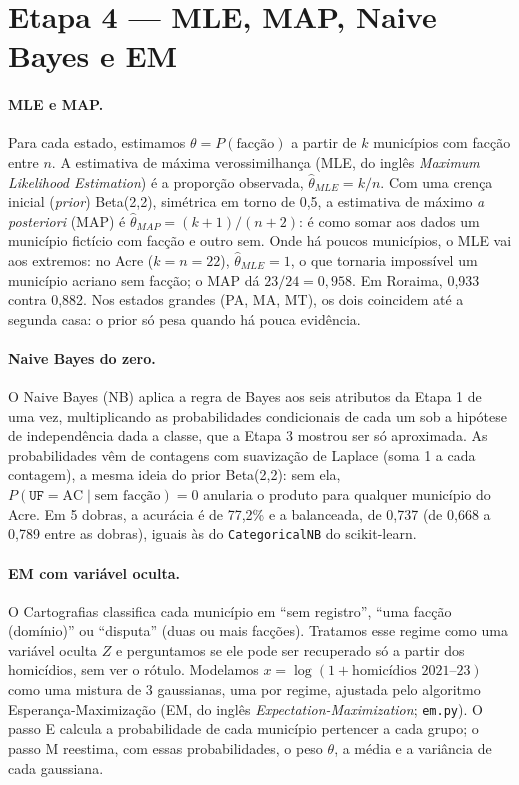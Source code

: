 \documentclass[article,12pt,oneside,a4paper,brazil,sumario=tradicional]{abntex2}
\begin{document}
\section{Etapa 4 --- MLE, MAP, Naive Bayes e EM}

\paragraph{MLE e MAP.} Para cada estado, estimamos $\theta=P(\text{facção})$ a partir de $k$
municípios com facção entre $n$. A estimativa de máxima verossimilhança (MLE, do inglês
\emph{Maximum Likelihood Estimation}) é a proporção observada, $\hat\theta_{MLE}=k/n$. Com
uma crença inicial (\emph{prior}) Beta(2,2), simétrica em torno de 0,5, a estimativa de
máximo \emph{a posteriori} (MAP) é $\hat\theta_{MAP}=(k+1)/(n+2)$: é como somar aos dados
um município fictício com facção e outro sem. Onde há poucos municípios, o MLE vai aos
extremos: no Acre ($k=n=22$), $\hat\theta_{MLE}=1$, o que tornaria impossível um município
acriano sem facção; o MAP dá $23/24=0{,}958$. Em Roraima, 0,933 contra 0,882. Nos estados
grandes (PA, MA, MT), os dois coincidem até a segunda casa: o prior só pesa quando há pouca
evidência.

\paragraph{Naive Bayes do zero.} O Naive Bayes (NB) aplica a regra de Bayes aos seis
atributos da Etapa 1 de uma vez, multiplicando as probabilidades condicionais de cada um sob
a hipótese de independência dada a classe, que a Etapa 3 mostrou ser só aproximada. As
probabilidades vêm de contagens com suavização de Laplace (soma 1 a cada contagem), a mesma
ideia do prior Beta(2,2): sem ela, $P(\texttt{UF}{=}\text{AC}\mid\text{sem facção})=0$
anularia o produto para qualquer município do Acre. Em 5 dobras, a acurácia é de 77,2\% e a
balanceada, de 0,737 (de 0,668 a 0,789 entre as dobras), iguais às do \texttt{CategoricalNB}
do scikit-learn.

\paragraph{EM com variável oculta.} O Cartografias classifica cada município em ``sem
registro'', ``uma facção (domínio)'' ou ``disputa'' (duas ou mais facções). Tratamos esse
regime como uma variável oculta $Z$ e perguntamos se ele pode ser recuperado só a partir dos
homicídios, sem ver o rótulo. Modelamos $x=\log(1+\text{homicídios 2021--23})$ como uma
mistura de 3 gaussianas, uma por regime, ajustada pelo algoritmo Esperança-Maximização (EM,
do inglês \emph{Expectation-Maximization}; \texttt{em.py}). O passo E calcula a
probabilidade de cada município pertencer a cada grupo; o passo M reestima, com essas
probabilidades, o peso $\theta$, a média e a variância de cada gaussiana.
\end{document}
